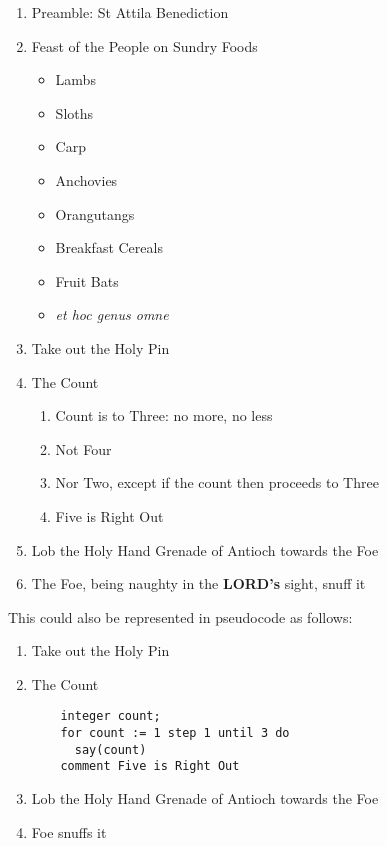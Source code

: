 \documentclass{metanorma}
\let\bcp\relax%
\begin{document}
\begin{enumerate}
  \item Preamble: St Attila Benediction
  \item Feast of the People on Sundry Foods
    \begin{itemize}
      \item Lambs
      \item Sloths
      \item Carp
      \item Anchovies
      \item Orangutangs
      \item Breakfast Cereals
      \item Fruit Bats
      \item \textit{et hoc genus omne}
    \end{itemize}
  \item Take out the Holy Pin
  \item The Count
    \begin{enumerate}%
      \item Count is to Three: no more, no less
      \item Not Four
      \item Nor Two, except if the count then proceeds to Three
      \item Five is Right Out
    \end{enumerate}
  \item Lob the Holy Hand Grenade of Antioch towards the Foe
  \item The Foe, being naughty in the \textbf{LORD's} sight, \bcp{shall} snuff it
\end{enumerate}


This could also be represented in pseudocode as follows:


\begin{enumerate}
  \item Take out the Holy Pin
  \item The Count
    \begin{verbatim}
    integer count;
    for count := 1 step 1 until 3 do
      say(count)
    comment Five is Right Out
    \end{verbatim}
  \item Lob the Holy Hand Grenade of Antioch towards the Foe
  \item Foe snuffs it
\end{enumerate}
\end{document}
